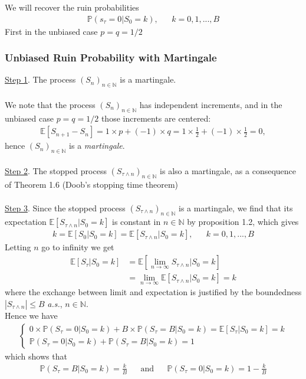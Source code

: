 \documentclass[12pt]{extarticle}
\newcommand{\<}{\langle}
\renewcommand{\>}{\rangle}
\theoremstyle{definition}
\begin{document}
\newpage
We will recover the ruin probabilities
\begin{align*}
    \mathbb{P}(s_\tau =0 | S_0 = k), && k=0,1,...,B
\end{align*}
First in the unbiased case $p=q=1/2$

\subsubsection{Unbiased Ruin Probability with Martingale}
\underline{Step 1}. The process $(S_n)_{n \in \mathbb{N}}$ is a martingale. \\ \\
We note that the process $(S_n)_{n \in \mathbb{N}}$ has independent increments, and in the unbiased case $p=q=1/2$ those increments are centered:
\begin{align*}
    \mathbb{E}[S_{n+1} - S_n]=1 \times p + (-1) \times q = 1 \times \frac{1}{2} + (-1) \times \frac{1}{2} =0,
\end{align*}
hence $(S_n)_{n \in \mathbb{N}}$ is a \textit{martingale}.\\ \\
\underline{Step 2}. The stopped process $(S_{\tau \wedge n})_{n \in \mathbb{N}}$ is also a martingale, as a consequence of Theorem 1.6 (Doob's stopping time theorem)\\ \\
\underline{Step 3}. Since the stopped process $(S_{\tau \wedge n})_{n \in \mathbb{N}}$ is a martingale, we find that its expectation $\mathbb{E}[S_{\tau \wedge n}|S_0 = k]$ is constant in $n \in \mathbb{N}$ by proposition 1.2, which gives
\begin{align*}
        k=\mathbb{E}[S_0 |S_0=k]=\mathbb{E}[S_{\tau \wedge n} |S_0=k], && k=0,1,...,B
\end{align*}
Letting $n$ go to infinity we get
\begin{align*}
    \mathbb{E}[S_\tau | S_0 =k] &= \mathbb{E}\left[\lim_{n \to \infty} S_{\tau \wedge n} | S_0 =k\right] \\
    &= \lim_{n \to \infty} \mathbb{E}[S_{\tau \wedge n} | S_0 =k] =k
\end{align*}
where the exchange between limit and expectation is justified by the boundedness $|S_{\tau \wedge n}| \leq B$ \textit{a.s.}, $n \in \mathbb{N}$.\\
Hence we have
\begin{align*}
    \begin{cases}
        0 \times \mathbb{P}(S_\tau =0|S_0 =k) + B \times \mathbb{P}(S_\tau =B|S_0 =k) =\mathbb{E}[S_\tau | S_0 =k] =k \\
        \mathbb{P}(S_\tau =0|S_0 =k) + \mathbb{P}(S_\tau =B|S_0 =k) = 1
    \end{cases}
\end{align*}
which shows that
\begin{align*}
    \mathbb{P}(S_\tau =B|S_0 =k)=\frac{k}{B} && \text{and} && \mathbb{P}(S_\tau =0|S_0 =k)=1-\frac{k}{B}
\end{align*}
\end{document}
